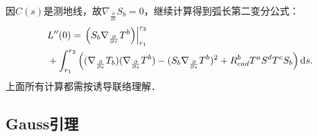 因$C(s)$是测地线，故$\nabla_{\frac{\partial}{\partial s}} {S}_b=0$，继续计算得到{\heiti 弧长第二变分公式}：
\begin{equation}\label{chgd:eqn_2st-var-arc}
    \begin{aligned}
    &L''(0)= \left.\left( {S}_b  \nabla_{\frac{\partial}{\partial \tau}} {T}^b \right)\right|_{r_1}^{r_2} \\
    & +\int_{r_1}^{r_2} \left( (\nabla_{\frac{\partial}{\partial s}} {T}_b)
       (\nabla_{\frac{\partial}{\partial s}} {T}^b)
       -({S}_b \nabla_{\frac{\partial}{\partial s}} {T}^b)^2
     +  R_{cad}^b {T^a} {S^d}T{^c}{S}_b \right) {\rm d}s .
    \end{aligned}
\end{equation}
上面所有计算都需按诱导联络理解． 


\subsection{Gauss引理}

